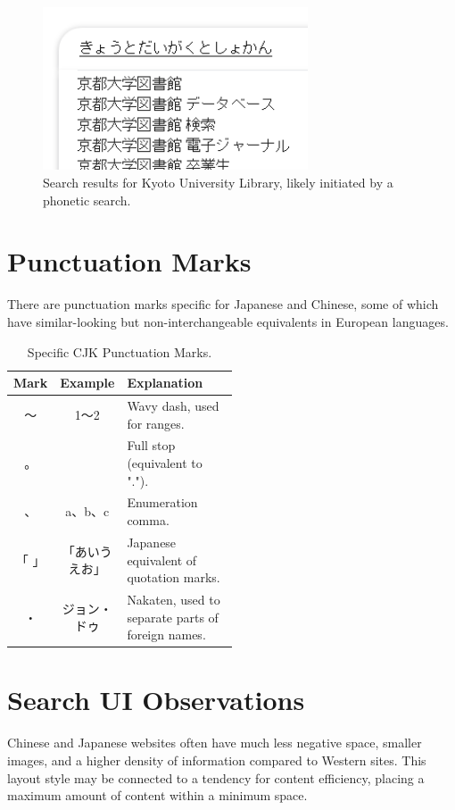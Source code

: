 \documentclass[11pt]{article}
\begin{document}
\begin{figure}[h!]
    \centering
    \includegraphics[width=0.7\textwidth]{image9.png}
    \caption{Search results for Kyoto University Library, likely initiated by a phonetic search.}
    \label{fig:kyoto_library_search}
\end{figure}

\section{Punctuation Marks}
There are punctuation marks specific for Japanese and Chinese, some of which have similar-looking but non-interchangeable equivalents in European languages.

\begin{table}[h!]
    \centering
    \caption{Specific CJK Punctuation Marks.}
    \begin{tabular}{c c p{0.5\linewidth}}
        \toprule
        \textbf{Mark} & \textbf{Example} & \textbf{Explanation} \\
        \midrule
        〜 & 1〜2 & Wavy dash, used for ranges. \\
        。 & & Full stop (equivalent to "."). \\
        、 & a、b、c & Enumeration comma. \\
        「 」 & 「あいうえお」 & Japanese equivalent of quotation marks. \\
        ・ & ジョン・ドゥ & Nakaten, used to separate parts of foreign names. \\
        \bottomrule
    \end{tabular}
\end{table}

\section{Search UI Observations}
Chinese and Japanese websites often have much less negative space, smaller images, and a higher density of information compared to Western sites. This layout style may be connected to a tendency for content efficiency, placing a maximum amount of content within a minimum space.
\end{document}
